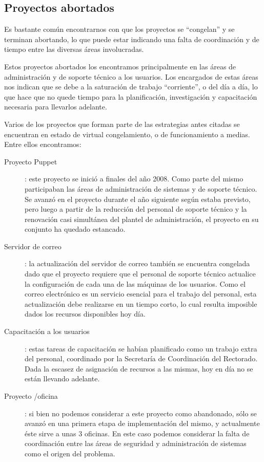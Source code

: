 \documentclass[a4paper,11pt,oneside]{article}
\begin{document}
\subsection*{Proyectos abortados}
Es bastante común encontrarnos con que los proyectos se ``congelan'' y
se terminan abortando, lo que puede estar indicando una falta de
coordinación y de tiempo entre las diversas áreas involucradas.

Estos proyectos abortados los encontramos principalmente en las áreas
de administración y de soporte técnico a los usuarios. Los encargados
de estas áreas nos indican que se debe a la saturación de trabajo
``corriente'', o del día a día, lo que hace que no quede tiempo para
la planificación, investigación y capacitación necesaria para
llevarlos adelante.

Varios de los proyectos que forman parte de las estrategias antes
citadas se encuentran en estado de virtual congelamiento, o de
funcionamiento a medias.  Entre ellos encontramos:
\begin{description}
\item[Proyecto Puppet]: este proyecto se inició a finales del año
  2008. Como parte del mismo participaban las áreas de administración
  de sistemas y de soporte técnico.  Se avanzó en el proyecto durante
  el año siguiente según estaba previsto, pero luego a partir de la
  reducción del personal de soporte técnico y la renovación casi
  simultánea del plantel de administración, el proyecto en su conjunto
  ha quedado estancado.
\item[Servidor de correo]: la actualización del servidor de correo
  también se encuentra congelada dado que el proyecto requiere que el
  personal de soporte técnico actualice la configuración de cada una
  de las máquinas de los usuarios. Como el correo electrónico es
  un servicio esencial para el trabajo del personal, esta
  actualización debe realizarse en un tiempo corto, lo cual resulta
  imposible dados los recursos disponibles hoy día.
\item[Capacitación a los usuarios]: estas tareas de capacitación se
  habían planificado como un trabajo extra del personal, coordinado
  por la Secretaría de Coordinación del Rectorado.  Dada la escasez de
  asignación de recursos a las mismas, hoy en día no se están
  llevando adelante.
\item[Proyecto /oficina]: si bien no podemos considerar a este
  proyecto como abandonado, sólo se avanzó en una primera etapa de
  implementación del mismo, y actualmente éste sirve a unas 3
  oficinas. En este caso podemos considerar la falta de coordinación
  entre las áreas de seguridad y administración de sistemas como el
  origen del problema.
\end{description}
%
\end{document}
